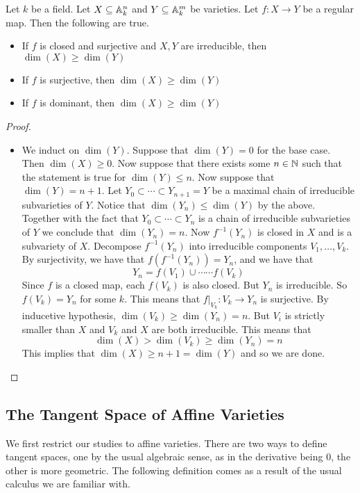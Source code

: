 \documentclass[a4paper]{article}
\begin{document}
\begin{prp}{}{} Let $k$ be a field. Let $X\subseteq\mathbb{A}_k^n$ and $Y\subseteq\mathbb{A}_k^m$ be varieties. Let $f:X\to Y$ be a regular map. Then the following are true. 
\begin{itemize}
\item If $f$ is closed and surjective and $X,Y$ are irreducible, then $\dim(X)\geq\dim(Y)$
\item If $f$ is surjective, then $\dim(X)\geq\dim(Y)$
\item If $f$ is dominant, then $\dim(X)\geq\dim(Y)$
\end{itemize} \tcbline
\begin{proof}~\\
\begin{itemize}
\item We induct on $\dim(Y)$. Suppose that $\dim(Y)=0$ for the base case. Then $\dim(X)\geq 0$. Now suppose that there exists some $n\in\mathbb{N}$ such that the statement is true for $\dim(Y)\leq n$. Now suppose that $\dim(Y)=n+1$. Let $Y_0\subset\cdots\subset Y_{n+1}=Y$ be a maximal chain of irreducible subvarieties of $Y$. Notice that $\dim(Y_n)\leq\dim(Y)$ by the above. Together with the fact that $Y_0\subset\cdots\subset Y_n$ is a chain of irreducible subvarieties of $Y$ we conclude that $\dim(Y_n)=n$. Now $f^{-1}(Y_n)$ is closed in $X$ and is a subvariety of $X$. Decompose $f^{-1}(Y_n)$ into irreducible components $V_1,\dots,V_k$. By surjectivity, we have that $f(f^{-1}(Y_n))=Y_n$, and we have that $$Y_n=f(V_1)\cup\cdots\cdots f(V_k)$$ Since $f$ is a closed map, each $f(V_k)$ is also closed. But $Y_n$ is irreducible. So $f(V_k)=Y_n$ for some $k$. This means that $f|_{V_k}:V_k\to Y_n$ is surjective. By inducetive hypothesis, $\dim(V_k)\geq\dim(Y_n)=n$. But $V_i$ is strictly smaller than $X$ and $V_k$ and $X$ are both irreducible. This means that $$\dim(X)>\dim(V_k)\geq\dim(Y_n)=n$$ This implies that $\dim(X)\geq n+1=\dim(Y)$ and so we are done. 
\end{itemize}
\end{proof}
\end{prp}

\subsection{The Tangent Space of Affine Varieties}
We first restrict our studies to affine varieties. There are two ways to define tangent spaces, one by the usual algebraic sense, as in the derivative being $0$, the other is more geometric. The following definition comes as a result of the usual calculus we are familiar with. 
\end{document}
